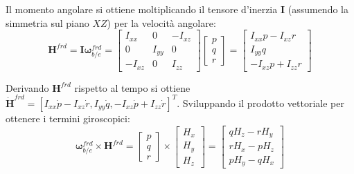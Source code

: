 Il momento angolare si ottiene moltiplicando il tensore d'inerzia $\mathbf{I}$ (assumendo la simmetria sul piano $XZ$) per la velocità angolare:
\begin{equation}
\mathbf{H}^{frd} = \mathbf{I} \boldsymbol{\omega}_{b/e}^{frd} = 
\begin{bmatrix} I_{xx} & 0 & -I_{xz} \\ 0 & I_{yy} & 0 \\ -I_{xz} & 0 & I_{zz} \end{bmatrix} 
\begin{bmatrix} p \\ q \\ r \end{bmatrix} = 
\begin{bmatrix} I_{xx}p - I_{xz}r \\ I_{yy}q \\ -I_{xz}p + I_{zz}r \end{bmatrix}
\end{equation}

Derivando $\mathbf{H}^{frd}$ rispetto al tempo si ottiene $\dot{\mathbf{H}}^{frd} = [I_{xx}\dot{p} - I_{xz}\dot{r}, I_{yy}\dot{q}, -I_{xz}\dot{p} + I_{zz}\dot{r}]^T$. 
Sviluppando il prodotto vettoriale per ottenere i termini giroscopici:
\begin{equation}
\boldsymbol{\omega}_{b/e}^{frd} \times \mathbf{H}^{frd} = \begin{bmatrix} p \\ q \\ r \end{bmatrix} \times \begin{bmatrix} H_x \\ H_y \\ H_z \end{bmatrix} = \begin{bmatrix} qH_z - rH_y \\ rH_x - pH_z \\ pH_y - qH_x \end{bmatrix}
\end{equation}

